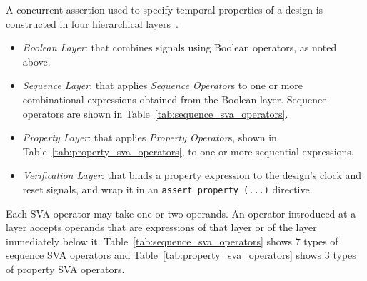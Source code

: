 A concurrent assertion used to specify temporal properties of a design is constructed in four hierarchical layers~\cite{IEEEStd}. 
\begin{itemize}
    \item \textit{Boolean Layer}: that combines signals using Boolean operators, as noted above.
    \item \textit{Sequence Layer}: that applies \textit{Sequence Operator}s to one or more combinational expressions obtained from the Boolean layer. Sequence operators are shown in Table~\ref{tab:sequence_sva_operators}.
    \item \textit{Property Layer}: that applies \textit{Property Operator}s, shown in Table~\ref{tab:property_sva_operators}, to one or more sequential expressions.
    \item \textit{Verification Layer}: that binds a property expression to the design’s clock and reset signals, and wrap it in an \texttt{assert property (...)} directive.
\end{itemize}
Each SVA operator may take one or two operands. An operator introduced at a layer accepts operands that are expressions of that layer or of the layer immediately below it. Table~\ref{tab:sequence_sva_operators} shows $7$ types of sequence SVA operators and Table~\ref{tab:property_sva_operators}  shows $3$ types of property SVA operators.
